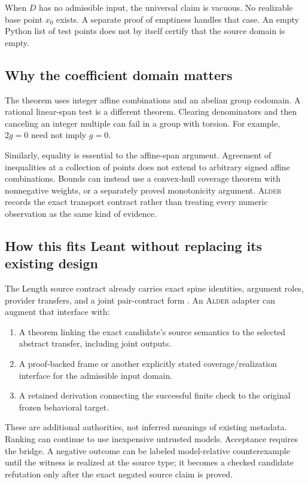 \documentclass[11pt,a4paper]{article}
\newcommand{\Alder}{\textsc{Alder}}
\newcommand{\kw}[1]{\textsf{#1}}
\theoremstyle{plain}
\theoremstyle{definition}
\theoremstyle{remark}
\begin{document}
When $D$ has no admissible input, the universal claim is vacuous. No realizable base point $x_0$ exists. A separate proof of emptiness handles that case. An empty Python list of test points does not by itself certify that the source domain is empty.

\subsection{Why the coefficient domain matters}
The theorem uses integer affine combinations and an abelian group codomain. A rational linear-span test is a different theorem. Clearing denominators and then canceling an integer multiple can fail in a group with torsion. For example, $2g=0$ need not imply $g=0$.

Similarly, equality is essential to the affine-span argument. Agreement of inequalities at a collection of points does not extend to arbitrary signed affine combinations. Bounds can instead use a convex-hull coverage theorem with nonnegative weights, or a separately proved monotonicity argument. \Alder{} records the exact transport contract rather than treating every numeric observation as the same kind of evidence.

\subsection{How this fits Leant without replacing its existing design}
The Length source contract already carries exact spine identities, argument roles, provider transfers, and a joint pair-contract form \cite{lengthcontracts}. An \Alder{} adapter can augment that interface with:
\begin{enumerate}
\item A theorem linking the exact candidate's source semantics to the selected abstract transfer, including joint outputs.
\item A proof-backed frame or another explicitly stated coverage/realization interface for the admissible input domain.
\item A retained derivation connecting the successful finite check to the original frozen behavioral target.
\end{enumerate}
These are additional authorities, not inferred meanings of existing metadata. Ranking can continue to use inexpensive untrusted models. Acceptance requires the bridge. A negative outcome can be labeled \kw{model-relative counterexample} until the witness is realized at the source type; it becomes a \kw{checked candidate refutation} only after the exact negated source claim is proved.
\end{document}
